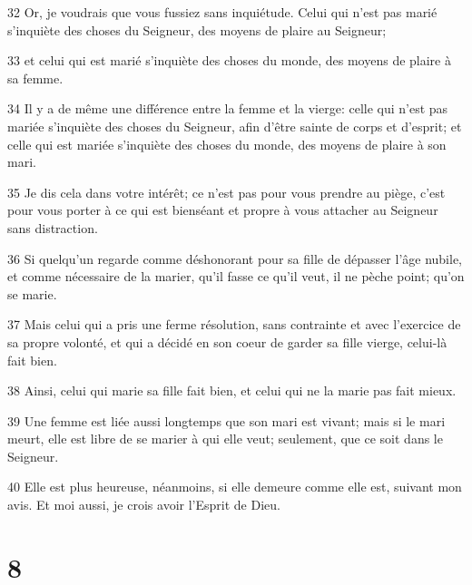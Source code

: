 \par 32 Or, je voudrais que vous fussiez sans inquiétude. Celui qui n'est pas marié s'inquiète des choses du Seigneur, des moyens de plaire au Seigneur;
\par 33 et celui qui est marié s'inquiète des choses du monde, des moyens de plaire à sa femme.
\par 34 Il y a de même une différence entre la femme et la vierge: celle qui n'est pas mariée s'inquiète des choses du Seigneur, afin d'être sainte de corps et d'esprit; et celle qui est mariée s'inquiète des choses du monde, des moyens de plaire à son mari.
\par 35 Je dis cela dans votre intérêt; ce n'est pas pour vous prendre au piège, c'est pour vous porter à ce qui est bienséant et propre à vous attacher au Seigneur sans distraction.
\par 36 Si quelqu'un regarde comme déshonorant pour sa fille de dépasser l'âge nubile, et comme nécessaire de la marier, qu'il fasse ce qu'il veut, il ne pèche point; qu'on se marie.
\par 37 Mais celui qui a pris une ferme résolution, sans contrainte et avec l'exercice de sa propre volonté, et qui a décidé en son coeur de garder sa fille vierge, celui-là fait bien.
\par 38 Ainsi, celui qui marie sa fille fait bien, et celui qui ne la marie pas fait mieux.
\par 39 Une femme est liée aussi longtemps que son mari est vivant; mais si le mari meurt, elle est libre de se marier à qui elle veut; seulement, que ce soit dans le Seigneur.
\par 40 Elle est plus heureuse, néanmoins, si elle demeure comme elle est, suivant mon avis. Et moi aussi, je crois avoir l'Esprit de Dieu.

\chapter{8}

